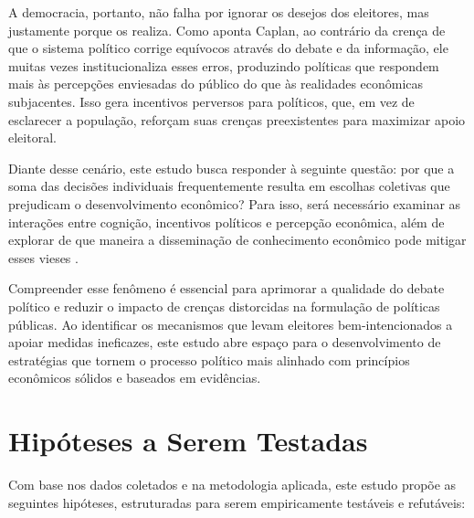 A democracia, portanto, não falha por ignorar os desejos dos eleitores, mas justamente porque os realiza. Como aponta Caplan, ao contrário da crença de que o sistema político corrige equívocos através do debate e da informação, ele muitas vezes institucionaliza esses erros, produzindo políticas que respondem mais às percepções enviesadas do público do que às realidades econômicas subjacentes. Isso gera incentivos perversos para políticos, que, em vez de esclarecer a população, reforçam suas crenças preexistentes para maximizar apoio eleitoral.

Diante desse cenário, este estudo busca responder à seguinte questão: por que a soma das decisões individuais frequentemente resulta em escolhas coletivas que prejudicam o desenvolvimento econômico? Para isso, será necessário examinar as interações entre cognição, incentivos políticos e percepção econômica, além de explorar de que maneira a disseminação de conhecimento econômico pode mitigar esses vieses \cite{positive_economics_friedman,Judgment_under_Uncertainty,kahneman2011thinking}.

Compreender esse fenômeno é essencial para aprimorar a qualidade do debate político e reduzir o impacto de crenças distorcidas na formulação de políticas públicas. Ao identificar os mecanismos que levam eleitores bem-intencionados a apoiar medidas ineficazes, este estudo abre espaço para o desenvolvimento de estratégias que tornem o processo político mais alinhado com princípios econômicos sólidos e baseados em evidências.  

\section{Hipóteses a Serem Testadas}

Com base nos dados coletados e na metodologia aplicada, este estudo propõe as seguintes hipóteses, estruturadas para serem empiricamente testáveis e refutáveis:

